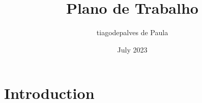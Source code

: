 \documentclass{article}
\title{Plano de Trabalho}
\author{tiagodepalves de Paula}
\date{July 2023}
\begin{document}
\maketitle

\section{Introduction}
\end{document}
